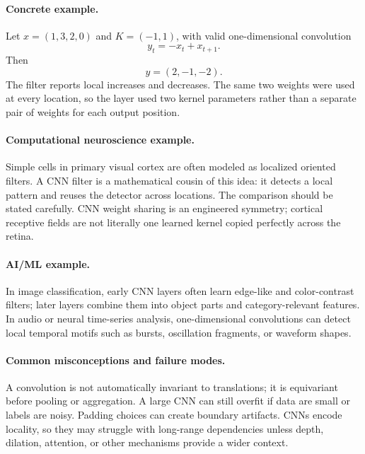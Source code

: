 \paragraph{Concrete example.}
Let \(x=(1,3,2,0)\) and \(K=(-1,1)\), with valid one-dimensional convolution
\[
y_t=-x_t+x_{t+1}.
\]
Then
\[
y=(2,-1,-2).
\]
The filter reports local increases and decreases. The same two weights were used at every location, so the layer used two kernel parameters rather than a separate pair of weights for each output position.

\paragraph{Computational neuroscience example.}
Simple cells in primary visual cortex are often modeled as localized oriented filters. A CNN filter is a mathematical cousin of this idea: it detects a local pattern and reuses the detector across locations. The comparison should be stated carefully. CNN weight sharing is an engineered symmetry; cortical receptive fields are not literally one learned kernel copied perfectly across the retina.

\paragraph{AI/ML example.}
In image classification, early CNN layers often learn edge-like and color-contrast filters; later layers combine them into object parts and category-relevant features. In audio or neural time-series analysis, one-dimensional convolutions can detect local temporal motifs such as bursts, oscillation fragments, or waveform shapes.

\paragraph{Common misconceptions and failure modes.}
A convolution is not automatically invariant to translations; it is equivariant before pooling or aggregation. A large CNN can still overfit if data are small or labels are noisy. Padding choices can create boundary artifacts. CNNs encode locality, so they may struggle with long-range dependencies unless depth, dilation, attention, or other mechanisms provide a wider context.

